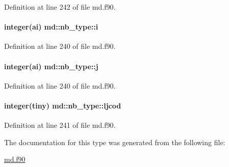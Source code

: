 Definition at line 242 of file md.\-f90.

\hypertarget{structmd_1_1nb__type_a90c49ae40c177027dac617f8137ab302}{
\paragraph[{i}]{\setlength{\rightskip}{0pt plus 5cm}integer(ai) md\-::nb\-\_\-type\-::i}}\label{structmd_1_1nb__type_a90c49ae40c177027dac617f8137ab302}


Definition at line 240 of file md.\-f90.

\hypertarget{structmd_1_1nb__type_ae67b72761c70d2a31c553e9713d9f079}{
\paragraph[{j}]{\setlength{\rightskip}{0pt plus 5cm}integer(ai) md\-::nb\-\_\-type\-::j}}\label{structmd_1_1nb__type_ae67b72761c70d2a31c553e9713d9f079}


Definition at line 240 of file md.\-f90.

\hypertarget{structmd_1_1nb__type_a70d4fa1eb6610768fbbea89585db9901}{
\paragraph[{ljcod}]{\setlength{\rightskip}{0pt plus 5cm}integer(tiny) md\-::nb\-\_\-type\-::ljcod}}\label{structmd_1_1nb__type_a70d4fa1eb6610768fbbea89585db9901}


Definition at line 241 of file md.\-f90.



The documentation for this type was generated from the following file\-:\begin{DoxyCompactItemize}
\item 
\hyperlink{md_8f90}{md.\-f90}\end{DoxyCompactItemize}
